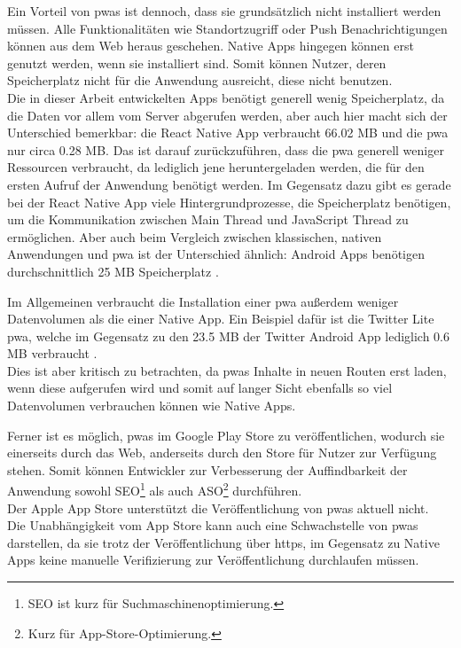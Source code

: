 Ein Vorteil von \acp{pwa} ist dennoch, dass sie grundsätzlich nicht installiert werden müssen.
Alle Funktionalitäten wie Standortzugriff oder Push Benachrichtigungen können aus dem Web heraus geschehen.
Native Apps hingegen können erst genutzt werden, wenn sie installiert sind.
Somit können Nutzer, deren Speicherplatz nicht für die Anwendung ausreicht, diese nicht benutzen.\\
Die in dieser Arbeit entwickelten Apps benötigt generell wenig Speicherplatz, da die Daten vor allem vom Server abgerufen werden, aber auch hier macht sich der Unterschied bemerkbar: die React Native App verbraucht 66.02 MB und die \ac{pwa} nur circa 0.28 MB.
Das ist darauf zurückzuführen, dass die \ac{pwa} generell weniger Ressourcen verbraucht, da lediglich jene heruntergeladen werden, die für den ersten Aufruf der Anwendung benötigt werden.
Im Gegensatz dazu gibt es gerade bei der React Native App viele Hintergrundprozesse, die Speicherplatz benötigen, um die Kommunikation zwischen Main Thread und JavaScript Thread zu ermöglichen.
Aber auch beim Vergleich zwischen klassischen, nativen Anwendungen und \ac{pwa} ist der Unterschied ähnlich: Android Apps benötigen durchschnittlich 25 MB Speicherplatz \cite{Bijlani.2021}.

Im Allgemeinen verbraucht die Installation einer \ac{pwa} außerdem weniger Datenvolumen als die einer Native App.
Ein Beispiel dafür ist die Twitter Lite \ac{pwa}, welche im Gegensatz zu den 23.5 MB der Twitter Android App lediglich 0.6 MB verbraucht \cite{Google.o.J.}.\\
Dies ist aber kritisch zu betrachten, da \acp{pwa} Inhalte in neuen Routen erst laden, wenn diese aufgerufen wird und somit auf langer Sicht ebenfalls so viel Datenvolumen verbrauchen können wie Native Apps.

Ferner ist es möglich, \acp{pwa} im Google Play Store zu veröffentlichen, wodurch sie einerseits durch das Web, anderseits durch den Store für Nutzer zur Verfügung stehen.
Somit können Entwickler zur Verbesserung der Auffindbarkeit der Anwendung sowohl SEO\footnote{SEO ist kurz für Suchmaschinenoptimierung.} als auch ASO\footnote{Kurz für App-Store-Optimierung.} durchführen.\\
Der Apple App Store unterstützt die Veröffentlichung von \acp{pwa} aktuell nicht.\\
Die Unabhängigkeit vom App Store kann auch eine Schwachstelle von \acp{pwa} darstellen, da sie trotz der Veröffentlichung über \ac{https}, im Gegensatz zu Native Apps keine manuelle Verifizierung zur Veröffentlichung durchlaufen müssen.

